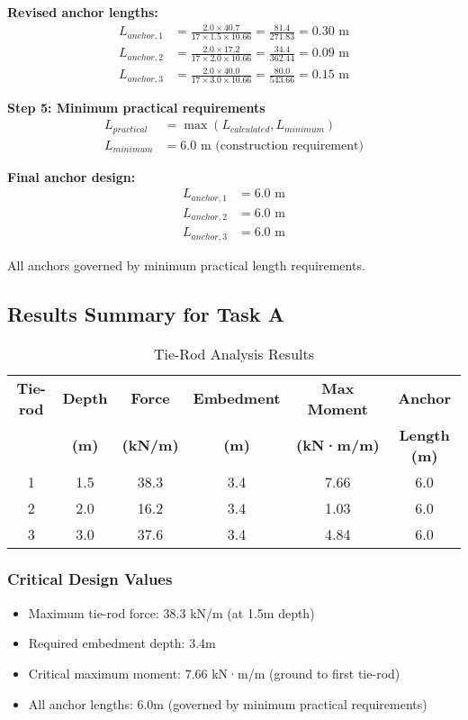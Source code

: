 \documentclass[10pt,a4paper,twocolumn]{article}
\begin{document}
\textbf{Revised anchor lengths:}
\begin{align}
L_{anchor,1} &= \frac{2.0 \times 40.7}{17 \times 1.5 \times 10.66} = \frac{81.4}{271.83} = 0.30 \text{ m} \\
L_{anchor,2} &= \frac{2.0 \times 17.2}{17 \times 2.0 \times 10.66} = \frac{34.4}{362.44} = 0.09 \text{ m} \\
L_{anchor,3} &= \frac{2.0 \times 40.0}{17 \times 3.0 \times 10.66} = \frac{80.0}{543.66} = 0.15 \text{ m}
\end{align}

\textbf{Step 5: Minimum practical requirements}
\begin{align}
L_{practical} &= \max(L_{calculated}, L_{minimum}) \\
L_{minimum} &= 6.0 \text{ m (construction requirement)}
\end{align}

\textbf{Final anchor design:}
\begin{align}
L_{anchor,1} &= 6.0 \text{ m} \\
L_{anchor,2} &= 6.0 \text{ m} \\
L_{anchor,3} &= 6.0 \text{ m}
\end{align}

All anchors governed by minimum practical length requirements.

\subsection{Results Summary for Task A}


\begin{table}[htbp]
\centering
\caption{Tie-Rod Analysis Results}
\begin{tabular}{@{}cccccc@{}}
\toprule
\textbf{Tie-rod} & \textbf{Depth} & \textbf{Force} & \textbf{Embedment} & \textbf{Max Moment} & \textbf{Anchor} \\
& \textbf{(m)} & \textbf{(kN/m)} & \textbf{(m)} & \textbf{(kN·m/m)} & \textbf{Length (m)} \\
\midrule
1 & 1.5 & 38.3 & 3.4 & 7.66 & 6.0 \\
2 & 2.0 & 16.2 & 3.4 & 1.03 & 6.0 \\
3 & 3.0 & 37.6 & 3.4 & 4.84 & 6.0 \\
\bottomrule
\end{tabular}
\end{table}

\subsubsection{Critical Design Values}
\begin{itemize}
\item Maximum tie-rod force: 38.3 kN/m (at 1.5m depth)
\item Required embedment depth: 3.4m
\item Critical maximum moment: 7.66 kN·m/m (ground to first tie-rod)
\item All anchor lengths: 6.0m (governed by minimum practical requirements)
\end{itemize}
\end{document}
